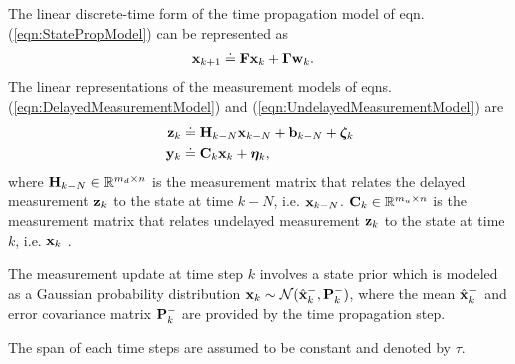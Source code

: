 The linear discrete-time form of the time propagation model of eqn. (\ref{eqn:StatePropModel}) can be represented as
\begin{align}
	\label{eqn:LinearStatePropModel}
	\mathbf{x}_{k+1} &\doteq \mathbf{F} \mathbf{x}_k + \boldsymbol{\Gamma} \mathbf{w}_k.
\end{align}
The linear representations of the measurement models of eqns. (\ref{eqn:DelayedMeasurementModel}) and (\ref{eqn:UndelayedMeasurementModel}) are
\begin{align} \label{eqn:LinearDelayedMeasurementModel}
	\mathbf{z}_k &\doteq \mathbf{H}_{k-N} \mathbf{x}_{k-N} + \mathbf{b}_{k-N} +\boldsymbol{\zeta}_k \\
	\label{eqn:LinearUndelayedMeasurementModel}
	\mathbf{y}_k &\doteq \mathbf{C}_k \mathbf{x}_k + \boldsymbol{\eta}_k,
\end{align}
where $\mathbf{H}_{k-N} \in \mathbb{R}^{m_d \times n}$ is the measurement matrix that relates the delayed measurement $\mathbf{z}_{k}$ to the state at time $k-N$, i.e. $\mathbf{x}_{k-N}$. 
$\mathbf{C}_k\in \mathbb{R}^{m_u \times n}$ is the measurement matrix that relates undelayed measurement $\mathbf{z}_k$ to the state at time $k$, i.e. $\mathbf{x}_k$ .

The measurement update at time step $k$ involves a state prior which is modeled as a Gaussian probability distribution $\mathbf{x}_k \sim \mathcal{N}(\hat{\mathbf{x}}_k^-,\mathbf{P}_k^-)$, where the mean $\hat{\mathbf{x}}_k^-$ and error covariance matrix $\mathbf{P}_k^-$ are provided by the time propagation step.

The span of each time steps are assumed to be constant and denoted by $\tau$.